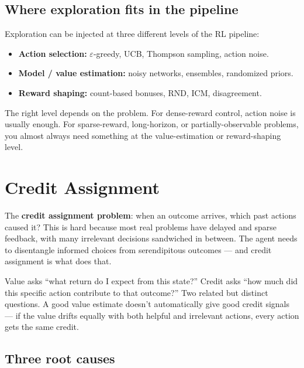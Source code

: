 \documentclass[11pt, oneside]{book}
\begin{document}
\subsection{Where exploration fits in the pipeline}

Exploration can be injected at three different levels of the RL pipeline:
\begin{itemize}
  \item \textbf{Action selection:} $\varepsilon$-greedy, UCB, Thompson sampling, action noise.
  \item \textbf{Model / value estimation:} noisy networks, ensembles, randomized priors.
  \item \textbf{Reward shaping:} count-based bonuses, RND, ICM, disagreement.
\end{itemize}
The right level depends on the problem.
For dense-reward control, action noise is usually enough.
For sparse-reward, long-horizon, or partially-observable problems, you almost always
need something at the value-estimation or reward-shaping level.

\section{Credit Assignment}

The \textbf{credit assignment problem}: when an outcome arrives, which past actions
caused it?
This is hard because most real problems have delayed and sparse feedback, with many
irrelevant decisions sandwiched in between. The agent needs to disentangle informed
choices from serendipitous outcomes --- and credit assignment is what does that.

\begin{intbox}[title={Credit vs.\ value}]
Value asks ``what return do I expect from this state?''
Credit asks ``how much did this specific action contribute to that outcome?''
Two related but distinct questions. A good value estimate doesn't automatically give
good credit signals --- if the value drifts equally with both helpful and irrelevant
actions, every action gets the same credit.
\end{intbox}

\subsection{Three root causes}
\end{document}
